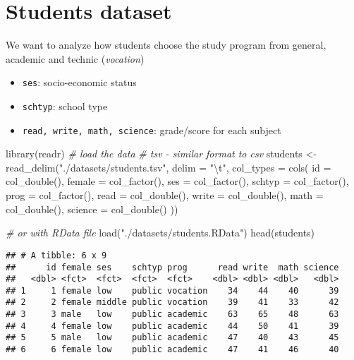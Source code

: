 \documentclass[
  oneside]{book}
\newenvironment{Shaded}{\begin{snugshade}}{\end{snugshade}}
\newcommand{\AttributeTok}[1]{\textcolor[rgb]{0.77,0.63,0.00}{#1}}
\newcommand{\CommentTok}[1]{\textcolor[rgb]{0.56,0.35,0.01}{\textit{#1}}}
\newcommand{\FunctionTok}[1]{\textcolor[rgb]{0.00,0.00,0.00}{#1}}
\newcommand{\NormalTok}[1]{#1}
\newcommand{\OtherTok}[1]{\textcolor[rgb]{0.56,0.35,0.01}{#1}}
\newcommand{\SpecialCharTok}[1]{\textcolor[rgb]{0.00,0.00,0.00}{#1}}
\newcommand{\StringTok}[1]{\textcolor[rgb]{0.31,0.60,0.02}{#1}}
\providecommand{\tightlist}{%
  \setlength{\itemsep}{0pt}\setlength{\parskip}{0pt}}
\begin{document}
\hypertarget{students-dataset}{%
\section{Students dataset}\label{students-dataset}}

We want to analyze how students choose the study program
from general, academic and technic (\emph{vocation})

\begin{itemize}
\tightlist
\item
  \texttt{ses}: socio-economic status
\item
  \texttt{schtyp}: school type
\item
  \texttt{read,\ write,\ math,\ science}: grade/score for each subject
\end{itemize}

\begin{Shaded}
\begin{Highlighting}[]
\FunctionTok{library}\NormalTok{(readr)}
\CommentTok{\# load the data}
\CommentTok{\# tsv {-} similar format to csv}
\NormalTok{students }\OtherTok{\textless{}{-}} \FunctionTok{read\_delim}\NormalTok{(}\StringTok{"./datasets/students.tsv"}\NormalTok{, }\AttributeTok{delim =} \StringTok{"}\SpecialCharTok{\textbackslash{}t}\StringTok{"}\NormalTok{, }\AttributeTok{col\_types =} \FunctionTok{cols}\NormalTok{(}
  \AttributeTok{id =} \FunctionTok{col\_double}\NormalTok{(),}
  \AttributeTok{female =} \FunctionTok{col\_factor}\NormalTok{(),}
  \AttributeTok{ses =} \FunctionTok{col\_factor}\NormalTok{(),}
  \AttributeTok{schtyp =} \FunctionTok{col\_factor}\NormalTok{(),}
  \AttributeTok{prog =} \FunctionTok{col\_factor}\NormalTok{(),}
  \AttributeTok{read =} \FunctionTok{col\_double}\NormalTok{(),}
  \AttributeTok{write =} \FunctionTok{col\_double}\NormalTok{(),}
  \AttributeTok{math =} \FunctionTok{col\_double}\NormalTok{(),}
  \AttributeTok{science =} \FunctionTok{col\_double}\NormalTok{()}
\NormalTok{))}

\CommentTok{\# or with RData file}
\FunctionTok{load}\NormalTok{(}\StringTok{"./datasets/students.RData"}\NormalTok{)}
\FunctionTok{head}\NormalTok{(students)}
\end{Highlighting}
\end{Shaded}

\begin{verbatim}
## # A tibble: 6 x 9
##      id female ses    schtyp prog      read write  math science
##   <dbl> <fct>  <fct>  <fct>  <fct>    <dbl> <dbl> <dbl>   <dbl>
## 1     1 female low    public vocation    34    44    40      39
## 2     2 female middle public vocation    39    41    33      42
## 3     3 male   low    public academic    63    65    48      63
## 4     4 female low    public academic    44    50    41      39
## 5     5 male   low    public academic    47    40    43      45
## 6     6 female low    public academic    47    41    46      40
\end{verbatim}
\end{document}
